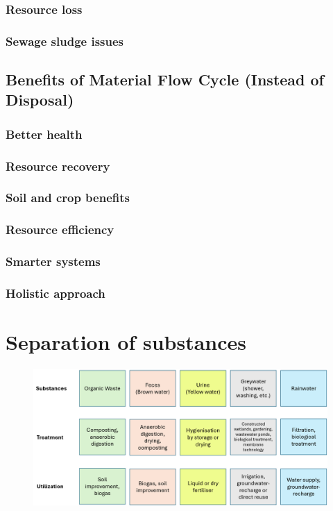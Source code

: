 \documentclass{article}
\begin{document}
\subsubsection{Resource loss}

\subsubsection{Sewage sludge issues}

\subsection{Benefits of Material Flow Cycle (Instead of Disposal)}
\subsubsection{Better health}

\subsubsection{Resource recovery}

\subsubsection{Soil and crop benefits}

\subsubsection{Resource efficiency}

\subsubsection{Smarter systems}

\subsubsection{Holistic approach}

\section{Separation of substances}
\begin{figure}[ht!]
    \centering
    \includegraphics[width=\textwidth]{media/separation_of_substances.png}
\end{figure}
\end{document}
